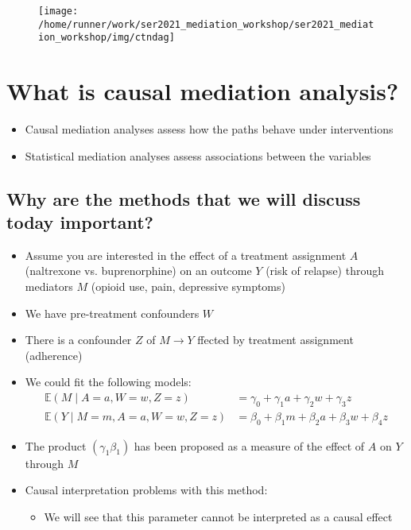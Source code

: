 \documentclass[
  12pt,
]{book}
\providecommand{\tightlist}{%
  \setlength{\itemsep}{0pt}\setlength{\parskip}{0pt}}
\theoremstyle{definition}
\theoremstyle{definition}
\theoremstyle{definition}
\newcommand{\E}{\mathbb{E}}
\newcommand{\1}{\mathbbm{1}}
\begin{document}
\begin{figure}

{\centering \texttt{[image: /home/runner/work/ser2021\_mediation\_workshop/ser2021\_mediation\_workshop/img/ctndag]} 

}

\end{figure}

\hypertarget{what-is-causal-mediation-analysis}{%
\section{What is causal mediation analysis?}\label{what-is-causal-mediation-analysis}}

\begin{itemize}
\tightlist
\item
  Causal mediation analyses assess how the paths behave under interventions
\item
  Statistical mediation analyses assess associations between the variables
\end{itemize}

\hypertarget{why-are-the-methods-that-we-will-discuss-today-important}{%
\subsection{Why are the methods that we will discuss today important?}\label{why-are-the-methods-that-we-will-discuss-today-important}}

\begin{itemize}
\tightlist
\item
  Assume you are interested in the effect of a treatment assignment \(A\) (naltrexone vs.
  buprenorphine) on an outcome \(Y\) (risk of relapse) through mediators \(M\)
  (opioid use, pain, depressive symptoms)
\item
  We have pre-treatment confounders \(W\)
\item
  There is a confounder \(Z\) of \(M\rightarrow Y\) ffected by treatment assignment (adherence)
\item
  We could fit the following models:
  \begin{align}
      \E(M\mid A=a, W=w, Z=z) & = \gamma_0 + \gamma_1 a + \gamma_2 w + \gamma_3 z \\
      \E(Y\mid M=m, A=a, W=w, Z=z) & = \beta_0 + \beta_1 m + \beta_2 a + \beta_3 w + \beta_4 z
    \end{align}
\item
  The product \((\gamma_1\beta_1)\) has been proposed as a measure of the effect
  of \(A\) on \(Y\) through \(M\)
\item
  Causal interpretation problems with this method:

  \begin{itemize}
  \tightlist
  \item
    We will see that this parameter cannot be interpreted as a causal effect
  \end{itemize}
\end{itemize}
\end{document}
